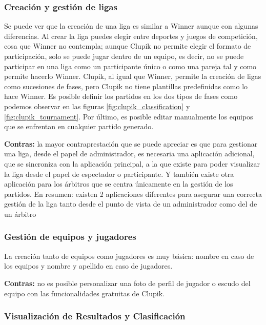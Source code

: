 \subsubsection*{Creación y gestión de ligas}

Se puede ver que la creación de una liga es similar a Winner aunque con algunas diferencias. Al crear la liga puedes elegir entre deportes y juegos de competición, cosa que Winner no contempla; aunque Clupik no permite elegir el formato de participación, solo se puede jugar dentro de un equipo, es decir, no se puede participar en una liga como un participante único o como una pareja tal y como permite hacerlo Winner. Clupik, al igual que Winner, permite la creación de ligas como sucesiones de fases, pero Clupik no tiene plantillas predefinidas como lo hace Winner. Es posible definir los partidos en los dos tipos de fases como podemos observar en las figuras \ref{fig:clupik_classification} y \ref{fig:clupik_tournament}. Por último, es posible editar manualmente los equipos que se enfrentan en cualquier partido generado.

\textbf{Contras:} la mayor contraprestación que se puede apreciar es que para gestionar una liga, desde el papel de administrador, es necesaria una aplicación adicional, que se sincroniza con la aplicación principal, a la que existe para poder visualizar la liga desde el papel de espectador o participante. Y también existe otra aplicación para los árbitros que se centra únicamente en la gestión de los partidos. En resumen: existen 2 aplicaciones diferentes para asegurar una correcta gestión de la liga tanto desde el punto de vista de un administrador como del de un árbitro

\subsubsection*{Gestión de equipos y jugadores}

La creación tanto de equipos como jugadores es muy básica: nombre en caso de los equipos y nombre y apellido en caso de jugadores.

\textbf{Contras:} no es posible personalizar una foto de perfil de jugador o escudo del equipo con las funcionalidades gratuitas de Clupik.

\subsubsection*{Visualización de Resultados y Clasificación}

